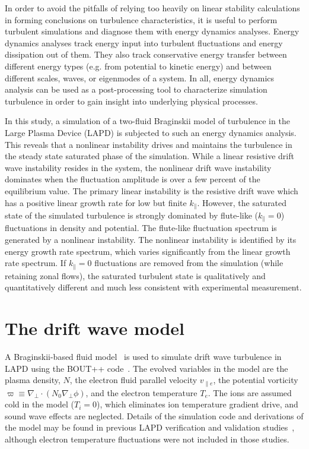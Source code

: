\documentclass[showpacs,preprintnumbers,amsmath,amssymb,superscriptaddress,aip]{revtex4-1}
\def\grad{\nabla}
\newcommand{\gradperp}{\grad_\perp}
\newcommand{\vpe}{v_{\parallel e}}
\begin{document}
In order to avoid the pitfalls of relying too heavily on linear stability calculations in forming conclusions on turbulence characteristics, it is useful to perform turbulent simulations
and diagnose them with energy dynamics analyses. Energy dynamics analyses track energy input into turbulent fluctuations and energy dissipation out of them. 
They also track conservative energy transfer
between different energy types (e.g. from potential to kinetic energy) and between different scales, waves, or eigenmodes of a system. 
In all, energy dynamics analysis can be used as a post-processing
tool to characterize simulation turbulence in order to gain insight into underlying physical processes. 

In this study, a simulation of a
two-fluid Braginskii model of turbulence in the Large Plasma Device (LAPD) is subjected to such an energy dynamics analysis. This reveals that a nonlinear instability drives and maintains
the turbulence in the steady state saturated phase of the simulation. While a linear resistive drift wave instability resides in the system, the nonlinear drift wave instability dominates
when the fluctuation amplitude is over a few percent of the equilibrium value. The primary linear instability is the resistive drift wave which has a positive linear
growth rate for low but finite $k_\parallel$.  However, the saturated state of the simulated turbulence is strongly dominated by flute-like ($k_\parallel = 0$) fluctuations in density and potential.
The flute-like fluctuation spectrum is generated by a nonlinear instability.  The nonlinear instability is identified by its energy growth rate spectrum, which
varies significantly from the linear growth rate spectrum.  If $k_\parallel=0$ fluctuations are removed from the simulation (while retaining zonal flows), 
the saturated turbulent state is qualitatively and quantitatively different and much less consistent with experimental measurement.


\section{The drift wave model}
\label{dw_model}

A Braginskii-based fluid model~\cite{Braginskii1965} is used to simulate drift wave turbulence in LAPD using the BOUT++ code~\cite{dudson2009}. 
The evolved variables in the model are the plasma density, $N$, the electron fluid parallel velocity $\vpe$, the potential vorticity $\varpi \equiv \gradperp \cdot (N_0 \gradperp \phi)$,
and the electron temperature $T_e$. The ions are assumed cold in the
model ($T_i = 0$), which eliminates ion temperature gradient drive,
and sound wave effects are neglected. Details of the simulation code and derivations of the model
may be found in previous LAPD verification and validation studies~\cite{Popovich2010a,Popovich2010b,Umansky2011,friedman2012}, 
although electron temperature fluctuations were not included in those studies.
\end{document}
